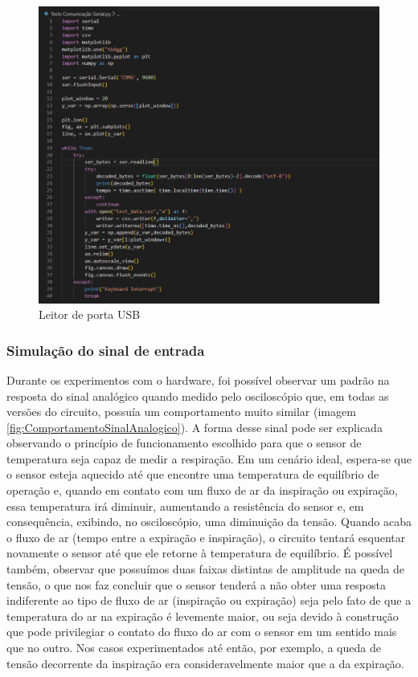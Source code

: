\begin{figure}[h!]
	\begin{center}
		\includegraphics[width=1\linewidth]{images/LeitorDeUSB.png}
		\caption{Leitor de porta USB}
		\label{fig:LeitorDeUSB}
	\end{center}
\end{figure}


\subsubsection{Simulação do sinal de entrada}

Durante os experimentos com o hardware, foi possível observar um padrão na resposta do sinal analógico quando medido pelo osciloscópio que, em todas as versões do circuito, possuía um comportamento muito similar (imagem \ref{fig:ComportamentoSinalAnalogico}). A forma desse sinal pode ser explicada observando o princípio de funcionamento escolhido para que o sensor de temperatura seja capaz de medir a respiração. Em um cenário ideal, espera-se que o sensor esteja aquecido até que encontre uma temperatura de equilíbrio de operação e, quando em contato com um fluxo de ar da inspiração ou expiração, essa temperatura irá diminuir, aumentando a resistência do sensor e, em consequência, exibindo, no osciloscópio, uma diminuição da tensão. Quando acaba o fluxo de ar (tempo entre a expiração e inspiração), o circuito tentará esquentar novamente o sensor até que ele retorne à temperatura de equilíbrio. É possível também, observar que possuímos duas faixas distintas de amplitude na queda de tensão, o que nos faz concluir que o sensor tenderá a não obter uma resposta indiferente ao tipo de fluxo de ar (inspiração ou expiração) seja pelo fato de que a temperatura do ar na expiração é levemente maior, ou seja devido à construção que pode privilegiar o contato do fluxo do ar com o sensor em um sentido mais que no outro. Nos casos experimentados até então, por exemplo, a queda de tensão decorrente da inspiração era consideravelmente maior que a da expiração.


